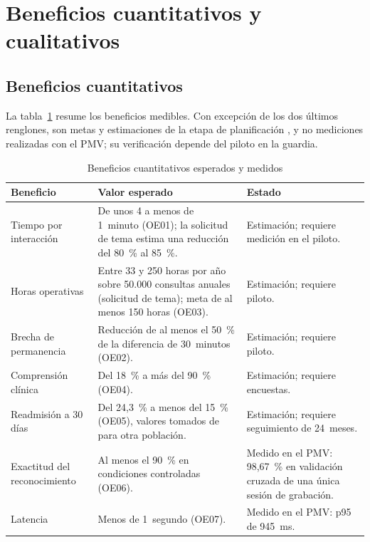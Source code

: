 \section{Beneficios cuantitativos y cualitativos}

\subsection{Beneficios cuantitativos}

La tabla~\ref{tab:beneficios} resume los beneficios medibles. Con excepción de los dos últimos renglones, son metas y estimaciones de la etapa de planificación \parencite{actaconstitucion2026,solicitudtema2026}, y no mediciones realizadas con el PMV; su verificación depende del piloto en la guardia.

\begin{table}[H]
  \centering
  \caption{Beneficios cuantitativos esperados y medidos}\label{tab:beneficios}
  \small
  \begin{tabularx}{\textwidth}{>{\raggedright\arraybackslash}p{2.6cm} >{\raggedright\arraybackslash}X >{\raggedright\arraybackslash}p{4.2cm}}
    \toprule
    \textbf{Beneficio} & \textbf{Valor esperado} & \textbf{Estado} \\
    \midrule
    Tiempo por interacción & De unos 4 a menos de 1~minuto (OE01); la solicitud de tema estima una reducción del 80~\% al 85~\%. & Estimación; requiere medición en el piloto. \\
    Horas operativas & Entre 33 y 250 horas por año sobre 50.000 consultas anuales (solicitud de tema); meta de al menos 150 horas (OE03). & Estimación; requiere piloto. \\
    Brecha de permanencia & Reducción de al menos el 50~\% de la diferencia de 30~minutos (OE02). & Estimación; requiere piloto. \\
    Comprensión clínica & Del 18~\% a más del 90~\% (OE04). & Estimación; requiere encuestas. \\
    Readmisión a 30 días & Del 24,3~\% a menos del 15~\% (OE05), valores tomados de \textcite{lindholm2012} para otra población. & Estimación; requiere seguimiento de 24~meses. \\
    Exactitud del reconocimiento & Al menos el 90~\% en condiciones controladas (OE06). & Medido en el PMV: 98,67~\% en validación cruzada de una única sesión de grabación. \\
    Latencia & Menos de 1~segundo (OE07). & Medido en el PMV: p95 de 945~ms. \\
    \bottomrule
  \end{tabularx}
\end{table}

